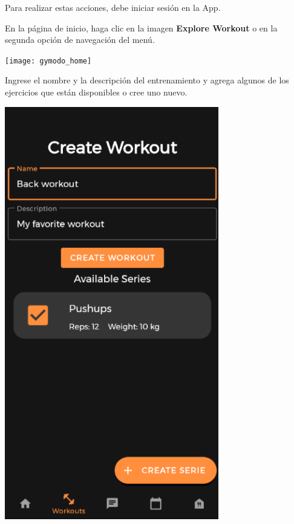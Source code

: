 \documentclass[12pt,a4paper]{article}
\begin{document}
\begin{enumerate}
\item Para realizar estas acciones, debe iniciar sesión en la App.

\begin{minipage}{.60\textwidth}
  \item En la página de inicio, haga clic en la imagen \textbf{Explore Workout} o en la segunda opción de navegación del menú.  
\end{minipage}
\begin{minipage}{.40\textwidth}
  \texttt{[image: gymodo\_home]}
\end{minipage}


\begin{minipage}{.60\textwidth}
  \item Ingrese el nombre y la descripción del entrenamiento y agrega algunos de los ejercicios que están disponibles o cree uno nuevo.
\end{minipage}
\begin{minipage}{.40\textwidth}
  \includegraphics[width=0.7\textwidth, right]{createworkout}
\end{minipage}



\end{enumerate}
\end{document}
